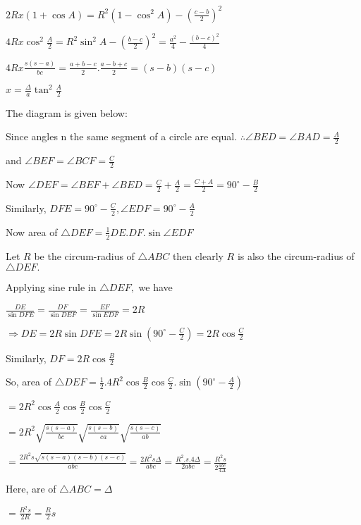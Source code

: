   $2Rx(1 + \cos A) = R^2(1 - \cos^2A) - \left(\frac{c - b}{2}\right)^2$

  $4Rx\cos^2\frac{A}{2} = R^2\sin^2A - \left(\frac{b - c}{2}\right)^2 = \frac{a^2}{4} - \frac{(b - c)^2}{4}$

  $4Rx\frac{s(s - a)}{bc} = \frac{a +b - c}{2}.\frac{a - b + c}{2} = (s - b)(s - c)$

  $x = \frac{\Delta}{a}\tan^2\frac{A}{2}$

\item The diagram is given below:

  \startplacefigure
    \externalfigure[21_5.pdf]
  \stopplacefigure

  Since angles n the same segment of a circle are equal. $\therefore \angle BED= \angle BAD = \frac{A}{2}$

  and $\angle BEF = \angle BCF = \frac{C}{2}$

  Now $\angle DEF = \angle BEF + \angle BED = \frac{C}{2} + \frac{A}{2} = \frac{C + A}{2} = 90^\circ - \frac{B}{2}$

  Similarly, $DFE = 90^\circ - \frac{C}{2}, \angle EDF = 90^\circ - \frac{A}{2}$

  Now area of $\triangle DEF = \frac{1}{2}DE.DF.\sin \angle EDF$

  Let $R$ be the circum-radius of $\triangle ABC$ then clearly $R$ is also the circum-radius of $\triangle DEF.$

  Applying sine rule in $\triangle DEF,$ we have

  $\frac{DE}{\sin DFE} = \frac{DF}{\sin DEF} = \frac{EF}{\sin EDF} = 2R$

  $\Rightarrow DE = 2R\sin DFE = 2R\sin\left(90^\circ - \frac{C}{2}\right) = 2R\cos\frac{C}{2}$

  Similarly, $DF = 2R\cos\frac{B}{2}$

  So, area of $\triangle DEF = \frac{1}{2}.4R^2\cos\frac{B}{2}\cos\frac{C}{2}.\sin\left(90^\circ - \frac{A}{2}\right)$

  $= 2R^2\cos\frac{A}{2}\cos\frac{B}{2}\cos\frac{C}{2}$

  $= 2R^2\sqrt{\frac{s(s - a)}{bc}}\sqrt{\frac{s(s - b)}{ca}}\sqrt{\frac{s(s - c)}{ab}}$

  $= \frac{2R^2s\sqrt{s(s - a)(s - b)(s - c)}}{abc} = \frac{2R^2s\Delta}{abc} = \frac{R^2.s.4\Delta}{2abc} = \frac{R^2s}{2\frac{abc}{4\Delta}}$

  Here, are of $\triangle ABC = \Delta$

  $= \frac{R^2s}{2R} = \frac{R}{2}s$

